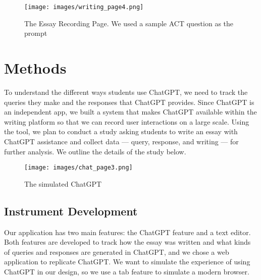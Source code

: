 \documentclass[sigconf]{acmart}
\newcommand{\out}[1]{{}} %
\newcommand{\sang}[1]{\out{{\small\textcolor{blue}{\bf [*** Sang: #1]}}}}
\begin{document}
\begin{figure*}[t]
    \centering
    \texttt{[image: images/writing\_page4.png]}
    \caption{The Essay Recording Page. We used a sample ACT question as the prompt}
    \label{fig:writ_page}
\end{figure*}

\section{Methods}

To understand the different ways students use ChatGPT, we need to track the queries they make and the responses that ChatGPT provides. Since ChatGPT is an independent app, we built a system that makes ChatGPT available within the writing platform so that we can record user interactions on a large scale. Using the tool, we plan to conduct a study asking students to write an essay with ChatGPT assistance and collect data --- query, response, and writing --- for further analysis. We outline the details of the study below.

\begin{figure*}[t]
    \centering
    \texttt{[image: images/chat\_page3.png]}
    \caption{The simulated ChatGPT}
    \label{fig:chat_page}
\end{figure*}

\subsection{Instrument Development}
    Our application has two main features: the ChatGPT feature and a text editor. Both features are developed to track how the essay was written and what kinds of queries and responses are generated in ChatGPT, and we chose a web application to replicate ChatGPT. We want to simulate the experience of using ChatGPT in our design, so we use a tab feature to simulate a modern browser.
    
\end{document}
